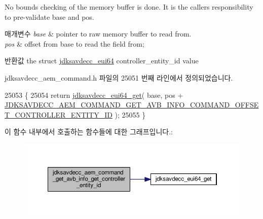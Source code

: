 No bounds checking of the memory buffer is done. It is the caller\textquotesingle{}s responsibility to pre-\/validate base and pos.


\begin{DoxyParams}{매개변수}
{\em base} & pointer to raw memory buffer to read from. \\
\hline
{\em pos} & offset from base to read the field from; \\
\hline
\end{DoxyParams}
\begin{DoxyReturn}{반환값}
the struct \hyperlink{structjdksavdecc__eui64}{jdksavdecc\+\_\+eui64} controller\+\_\+entity\+\_\+id value 
\end{DoxyReturn}


jdksavdecc\+\_\+aem\+\_\+command.\+h 파일의 25051 번째 라인에서 정의되었습니다.


\begin{DoxyCode}
25053 \{
25054     \textcolor{keywordflow}{return} \hyperlink{group__eui64_ga2652311a25a6b91cddbed75c108c7031}{jdksavdecc\_eui64\_get}( base, pos + 
      \hyperlink{group__command__get__avb__info_ga98dad4d7f7a18ee0c056c7fb95abb881}{JDKSAVDECC\_AEM\_COMMAND\_GET\_AVB\_INFO\_COMMAND\_OFFSET\_CONTROLLER\_ENTITY\_ID}
       );
25055 \}
\end{DoxyCode}


이 함수 내부에서 호출하는 함수들에 대한 그래프입니다.\+:
\nopagebreak
\begin{figure}[H]
\begin{center}
\leavevmode
\includegraphics[width=350pt]{group__command__get__avb__info_ga611d8231cc6f8a57007a4de1ec663c4e_cgraph}
\end{center}
\end{figure}


